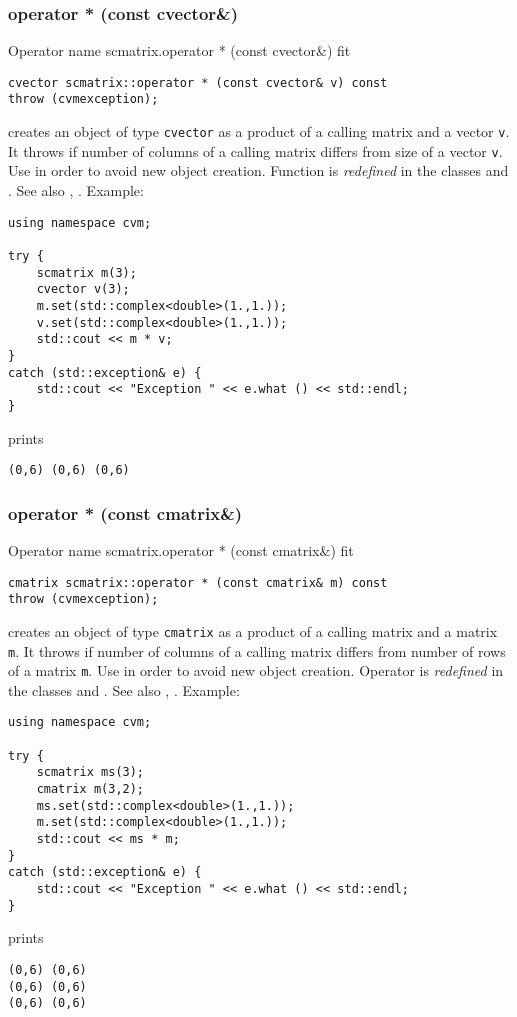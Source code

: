 \subsubsection{operator * (const cvector\&)}
Operator%
\pdfdest name {scmatrix.operator * (const cvector&)} fit
\begin{verbatim}
cvector scmatrix::operator * (const cvector& v) const
throw (cvmexception);
\end{verbatim}
creates an object of type \verb"cvector"
as a product of a calling matrix and a vector \verb"v".
It throws  
if  number of columns of a calling matrix
differs from  size of a vector \verb"v".
Use 
in order to avoid new object creation.
Function is \emph{redefined} in the classes
and .
See also
, .
Example:
\begin{Verbatim}
using namespace cvm;

try {
    scmatrix m(3);
    cvector v(3);
    m.set(std::complex<double>(1.,1.));
    v.set(std::complex<double>(1.,1.));
    std::cout << m * v;
}
catch (std::exception& e) {
    std::cout << "Exception " << e.what () << std::endl;
}
\end{Verbatim}
prints
\begin{Verbatim}
(0,6) (0,6) (0,6)
\end{Verbatim}
\newpage



\subsubsection{operator * (const cmatrix\&)}
Operator%
\pdfdest name {scmatrix.operator * (const cmatrix&)} fit
\begin{verbatim}
cmatrix scmatrix::operator * (const cmatrix& m) const
throw (cvmexception);
\end{verbatim}
creates an object of type \verb"cmatrix"
as a product of a calling matrix and a matrix \verb"m".
It throws  
if  number of columns of a calling matrix
differs from  number of rows of a matrix \verb"m".
Use  in order to avoid
 new object creation.
Operator is \emph{redefined} in the classes
and .
See also
, .
Example:
\begin{Verbatim}
using namespace cvm;

try {
    scmatrix ms(3);
    cmatrix m(3,2);
    ms.set(std::complex<double>(1.,1.));
    m.set(std::complex<double>(1.,1.));
    std::cout << ms * m;
}
catch (std::exception& e) {
    std::cout << "Exception " << e.what () << std::endl;
}
\end{Verbatim}
prints
\begin{Verbatim}
(0,6) (0,6)
(0,6) (0,6)
(0,6) (0,6)
\end{Verbatim}
\newpage



